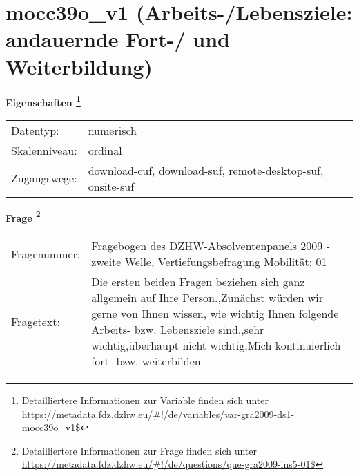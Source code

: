 
    \setcounter{footnote}{0}

    \vspace*{-1.8cm}
	\section{mocc39o\_v1 (Arbeits-/Lebensziele: andauernde Fort-/ und Weiterbildung)}
	\label{section:mocc39o_v1}



    \vspace*{0.5cm}
    \noindent\textbf{Eigenschaften
	\footnote{Detailliertere Informationen zur Variable finden sich unter
		\url{https://metadata.fdz.dzhw.eu/\#!/de/variables/var-gra2009-ds1-mocc39o_v1$}}}\\
	\begin{tabularx}{\hsize}{@{}lX}
	Datentyp: & numerisch \\
	Skalenniveau: & ordinal \\
	Zugangswege: &
	  download-cuf, 
	  download-suf, 
	  remote-desktop-suf, 
	  onsite-suf
 \\
    \end{tabularx}



				\vspace*{0.5cm}
                \noindent\textbf{Frage
	                \footnote{Detailliertere Informationen zur Frage finden sich unter
		              \url{https://metadata.fdz.dzhw.eu/\#!/de/questions/que-gra2009-ins5-01$}}}\\
				\begin{tabularx}{\hsize}{@{}lX}
					Fragenummer: &
					  Fragebogen des DZHW-Absolventenpanels 2009 - zweite Welle, Vertiefungsbefragung Mobilität:
					  01
 \\
					Fragetext: & Die ersten beiden Fragen beziehen sich ganz allgemein auf Ihre Person.,Zunächst würden wir gerne von Ihnen wissen, wie wichtig Ihnen folgende Arbeits- bzw. Lebensziele sind.,sehr wichtig,überhaupt nicht wichtig,Mich kontinuierlich fort- bzw. weiterbilden \\
				\end{tabularx}





